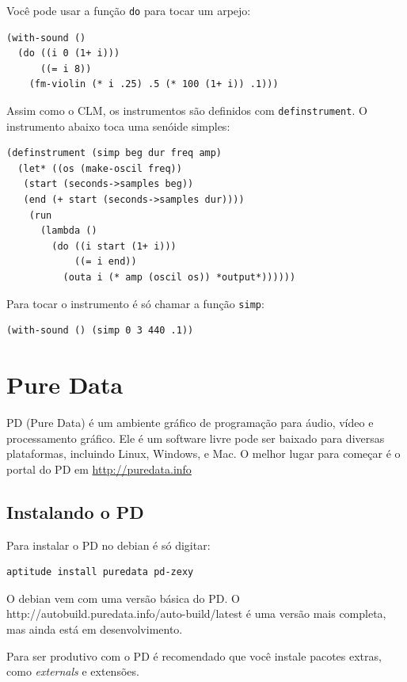 \documentclass[12pt,brazil]{book}
\begin{document}
Você pode usar a função \texttt{do} para tocar um arpejo:

\begin{verbatim}
(with-sound ()
  (do ((i 0 (1+ i)))
      ((= i 8))
    (fm-violin (* i .25) .5 (* 100 (1+ i)) .1)))
\end{verbatim}

Assim como o CLM, os instrumentos são definidos com
\texttt{definstrument}. O instrumento abaixo toca uma senóide simples:

\begin{verbatim}
(definstrument (simp beg dur freq amp)
  (let* ((os (make-oscil freq))
   (start (seconds->samples beg))
   (end (+ start (seconds->samples dur))))
    (run
      (lambda ()
        (do ((i start (1+ i))) 
            ((= i end))
          (outa i (* amp (oscil os)) *output*))))))
\end{verbatim}

Para tocar o instrumento é só chamar a função \texttt{simp}:

\begin{verbatim}
(with-sound () (simp 0 3 440 .1))
\end{verbatim}

\chapter{Pure Data}
\label{cha:pure-data}

PD (Pure Data) é um ambiente gráfico de programação para áudio, vídeo
e processamento gráfico. Ele é um software livre pode ser baixado para
diversas plataformas, incluindo Linux, Windows, e Mac. O melhor lugar
para começar é o portal do PD em \url{http://puredata.info}

\section{Instalando o PD}

Para instalar o PD no debian é só digitar:

\begin{verbatim}
aptitude install puredata pd-zexy
\end{verbatim}

O debian vem com uma versão básica do PD. O
{http://autobuild.puredata.info/auto-build/latest} é uma versão mais
completa, mas ainda está em desenvolvimento.

Para ser produtivo com o PD é recomendado que você instale pacotes
extras, como \textit{externals} e extensões.
\end{document}
